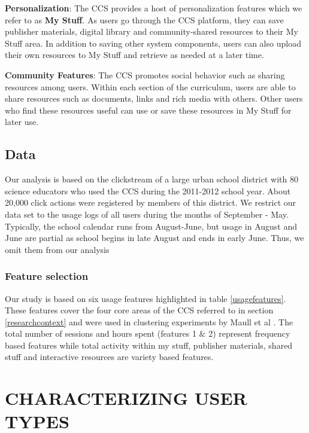 \documentclass{acm_proc_article-sp}
\begin{document}
\textbf{Personalization}:
The CCS provides a host of personalization features which we refer to as \textbf{My Stuff}. As users go through the CCS platform, they can save publisher materials, digital library and community-shared resources to their My Stuff area. In addition to saving other system components, users can also upload their own resources to My Stuff and retrieve as needed at a later time.

\textbf{Community Features}:
The CCS promotes social behavior such as sharing resources among users. Within each section of the curriculum, users are able to share resources such as documents, links and rich media with others. Other users who find these resources useful can use or save these resources in My Stuff for later use.

\subsection{Data}
Our analysis is based on the clickstream of a large urban school district with 80 science educators who used the CCS during the 2011-2012 school year. About 20,000 click actions were registered by members of this district. We restrict our data set to the usage logs of all users during the months of September - May. Typically, the school calendar runs from August-June, but usage in August and June are partial as school begins in late August and ends in early June. Thus, we omit them from our analysis

\subsubsection{Feature selection}\label{usagefeaturesection}
Our study is based on six usage features highlighted in table \ref{usagefeatures}. These features cover the four core areas of the CCS referred to in section \ref{researchcontext} and were used in clustering experiments by Maull et al \cite{maullunderstanding}. The total number of sessions and hours spent (features 1 \& 2) represent frequency based features while total activity within my stuff, publisher materials, shared stuff and interactive resources are variety based features. 

\section{CHARACTERIZING USER TYPES}\label{charusertypes}
\end{document}
